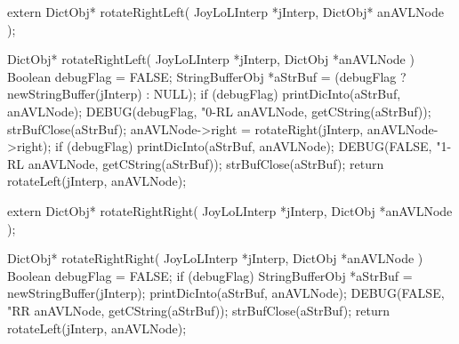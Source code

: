 \startCHeader
extern DictObj* rotateRightLeft(
  JoyLoLInterp *jInterp,
  DictObj* anAVLNode
);
\stopCHeader

\startCCode
DictObj* rotateRightLeft(
  JoyLoLInterp *jInterp,
  DictObj      *anAVLNode
) {
  Boolean debugFlag = FALSE;
  StringBufferObj *aStrBuf =
    (debugFlag ? newStringBuffer(jInterp) : NULL);
  if (debugFlag) {
    printDicInto(aStrBuf, anAVLNode);
    DEBUG(debugFlag, "0-RL %
      anAVLNode, getCString(aStrBuf));
    strBufClose(aStrBuf);
  }
  anAVLNode->right = rotateRight(jInterp, anAVLNode->right);
  if (debugFlag) {
    printDicInto(aStrBuf, anAVLNode);
    DEBUG(FALSE, "1-RL %
      anAVLNode, getCString(aStrBuf));
    strBufClose(aStrBuf);
  }
  return rotateLeft(jInterp, anAVLNode);
}
\stopCCode

\startCHeader
extern DictObj* rotateRightRight(
  JoyLoLInterp *jInterp,
  DictObj      *anAVLNode
);
\stopCHeader

\startCCode
DictObj* rotateRightRight(
  JoyLoLInterp *jInterp,
  DictObj      *anAVLNode
) {
  Boolean debugFlag = FALSE;
  if (debugFlag) {
    StringBufferObj *aStrBuf = newStringBuffer(jInterp);
    printDicInto(aStrBuf, anAVLNode);
    DEBUG(FALSE, "RR %
      anAVLNode, getCString(aStrBuf));
    strBufClose(aStrBuf);
  }
  return rotateLeft(jInterp, anAVLNode);
}
\stopCCode

